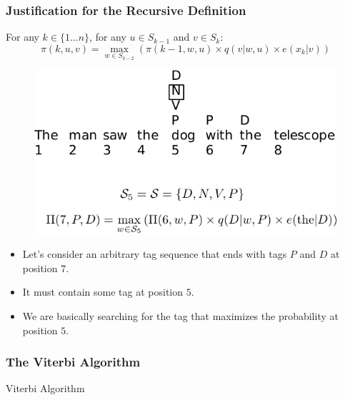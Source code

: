 \documentclass[handout]{beamer}
\begin{document}
\begin{frame}
  \frametitle{Justification for the Recursive Definition}
  \scriptsize
  For any $k \in \{1 \ldots n\}$, for any $u \in S_{k-1}$ and $v \in S_k$:
  \[
    \pi(k, u, v) = \max_{w \in S_{k-2}} (\pi(k - 1, w, u) \times q(v|w, u) \times e(x_k|v))
  \]

  
  \begin{figure}[h]
        	\includegraphics[scale = 0.6]{pics/viterbi2.pdf}
        \end{figure}
        
  \begin{itemize}
   \item Let's consider an arbitrary tag sequence that ends with tags $P$ and $D$ at position $7$.
   \item It must contain some tag at position $5$.
\item We are basically searching for the tag that maximizes the probability at position $5$.
  \end{itemize}
      
        
\end{frame}



\begin{frame}
  \frametitle{The Viterbi Algorithm}
\begin{algorithm}[H]



\BlankLine
\SetAlgoLined
\caption{Viterbi Algorithm}
\label{algo:prob_inference}
\BlankLine




\BlankLine
{} 
\end{algorithm}
\end{frame}
\end{document}
